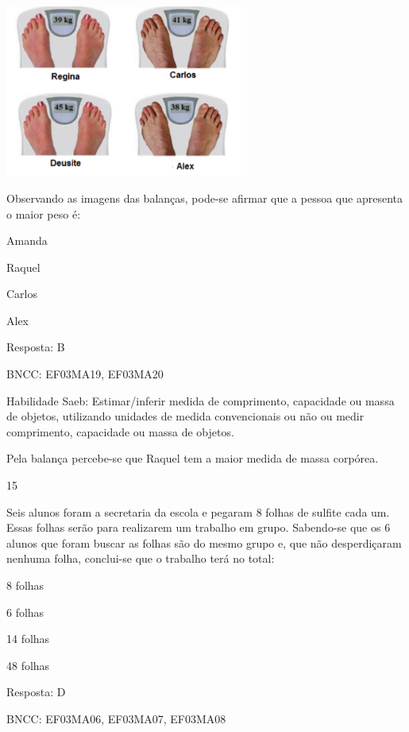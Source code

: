 \begin{escolha}
{\begin{escolha}
{\includegraphics[width=3.15196in,height=2.22201in]{media/image128.png}

Observando as imagens das balanças, pode-se afirmar que a pessoa que
apresenta o maior peso é:

\begin{escolha}

\item
  Amanda
\item
  Raquel
\item
  Carlos
\item
  Alex
\end{escolha}

Resposta: B

BNCC: EF03MA19, EF03MA20

Habilidade Saeb: Estimar/inferir medida de comprimento, capacidade ou
massa de objetos, utilizando unidades de medida convencionais ou não ou
medir comprimento, capacidade ou massa de objetos.

Pela balança percebe-se que Raquel tem a maior medida de massa corpórea.

\num{15}

Seis alunos foram a secretaria da escola e pegaram 8 folhas de sulfite
cada um. Essas folhas serão para realizarem um trabalho em grupo.
Sabendo-se que os 6 alunos que foram buscar as folhas são do mesmo grupo
e, que não desperdiçaram nenhuma folha, conclui-se que o trabalho terá
no total:

\begin{escolha}

\item
  8 folhas
\item
  6 folhas
\item
  14 folhas
\item
  48 folhas
\end{escolha}

Resposta: D

BNCC: EF03MA06, EF03MA07, EF03MA08

}
\end{escolha}}
\end{escolha}
